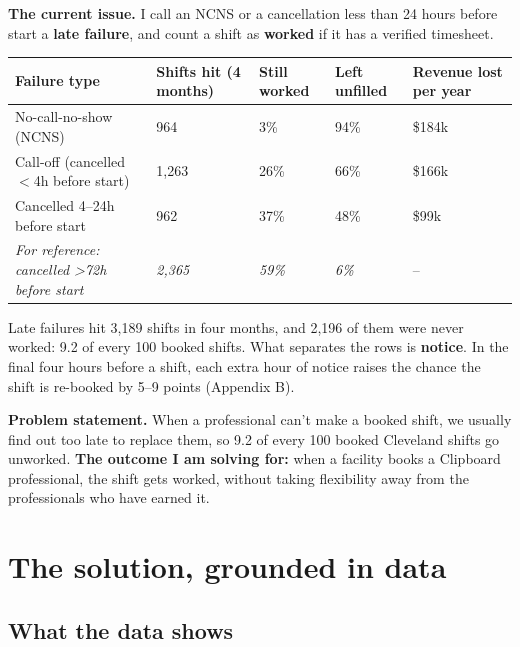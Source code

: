 \documentclass[11pt]{article}
\newcommand{\lthan}{\ensuremath{<}}
\begin{document}
\textbf{The current issue.} I call an NCNS or a cancellation less than 24 hours before start a \textbf{late failure},
and count a shift as \textbf{worked} if it has a verified timesheet.

\begin{center}\small
{}
\begin{tabularx}{\textwidth}{@{}LR{2.3cm}R{1.6cm}R{1.6cm}R{2.3cm}@{}}
\toprule
Failure type & Shifts hit (4 months) & Still worked & Left unfilled & Revenue lost per year \\
\midrule
No-call-no-show (NCNS) & 964 & 3\% & 94\% & \$184k \\
Call-off (cancelled \lthan{}4h before start) & 1,263 & 26\% & 66\% & \$166k \\
Cancelled 4--24h before start & 962 & 37\% & 48\% & \$99k \\
\textit{For reference: cancelled \textgreater72h before start} & \textit{2,365} & \textit{59\%} & \textit{6\%} & -- \\
\bottomrule
\end{tabularx}
\end{center}

Late failures hit 3,189 shifts in four months, and 2,196 of them were never worked: 9.2 of every 100 booked shifts.
What separates the rows is \textbf{notice}. In the final four hours before a shift, each extra hour of notice raises the
chance the shift is re-booked by 5--9 points (Appendix B).

\begin{callout}
\textbf{Problem statement.} When a professional can't make a booked shift, we usually find out too late to replace them,
so 9.2 of every 100 booked Cleveland shifts go unworked. \textbf{The outcome I am solving for:} when a facility books a
Clipboard professional, the shift gets worked, without taking flexibility away from the professionals who have earned it.
\end{callout}

\section{The solution, grounded in data}

\subsection{What the data shows}
\end{document}
